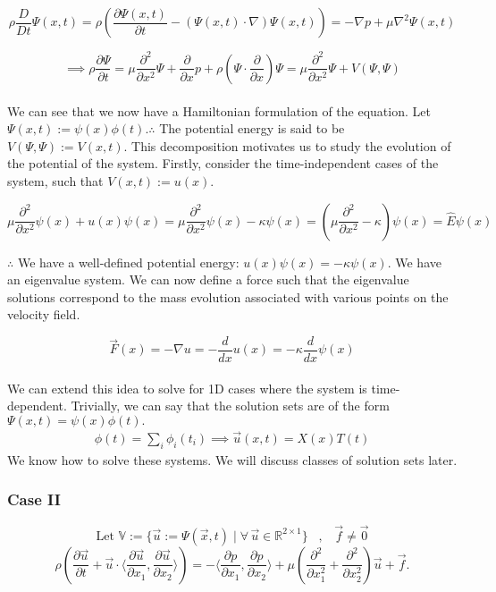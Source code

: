 \documentclass[12pt]{article}
\begin{document}
\[\rho\frac{D}{Dt} \Psi(x,t) = \rho \left( \frac{\partial \Psi(x,t)}{\partial t} - (\Psi(x,t) \cdot \nabla )\Psi(x,t) \right) = -\nabla p + \mu \nabla^{2}\Psi(x,t)\]

 \[\implies \rho \frac{\partial \Psi}{\partial t}  = \mu \frac{\partial^{2}}{\partial x^{2}}\Psi + \frac{\partial}{\partial x} p + \rho \left(\Psi \cdot \frac{\partial}{\partial x} \right)\Psi =  \mu \frac{\partial^{2}}{\partial x^{2}}\Psi + V(\Psi, \Psi)\] \\ 
 We can see that we now have a Hamiltonian formulation of the equation. Let $\Psi (x, t) := \psi(x)\phi(t). \therefore $ The potential energy is said to be $V(\Psi, \Psi) := V(x,t)$. This decomposition motivates us to study the evolution of the potential of the system. Firstly, consider the time-independent cases of the system, such that $V(x,t):= u(x)$. 

 \[\mu \frac{\partial^{2}}{\partial x^{2}}\psi(x) + u(x)\psi(x) = \mu \frac{\partial^{2}}{\partial x^{2}}\psi(x) - \kappa \psi(x) = \left( \mu \frac{\partial^{2}}{\partial x^{2}} - \kappa \right)\psi(x) = \hat E \psi(x)\]

$\therefore $ We have a well-defined potential energy: $u(x)\psi(x) = -\kappa \psi(x)$. We have an eigenvalue system. We can now define a force such that the eigenvalue solutions correspond to the mass evolution associated with various points on the velocity field. 

\[\vec F(x) = -\nabla u = - \frac{d}{dx} u (x) = - \kappa \frac{d}{dx}\psi(x)\] \\ 
We can extend this idea to solve for 1D cases where the system is time-dependent. Trivially, we can say that the solution sets are of the form $\Psi(x,t) = \psi(x)\phi(t).$ 
\begin{align}
\phi(t) = \sum_{i} \phi_{i}(t_{i}) \implies \vec u (x,t) = X(x)T(t)\end{align}
We know how to solve these systems. We will discuss classes of solution sets later. 

\subsubsection {Case II}
\textbf{\[\text{Let } \mathbb{V} := \{\vec u := \Psi (\vec x,t)\;|\;\forall \,\vec u \in \mathbb{R}^{2 \times 1} \}\;\;\;,\;\;\; \vec f \ne \vec 0 \]}
\[
\rho \left( \frac{\partial \vec{u}}{\partial t} + \vec{u} \cdot \langle \frac{\partial \vec u}{\partial x_1}, \frac{\partial \vec u}{\partial x_2} \rangle \right) = 
-\langle \frac{\partial p}{\partial x_1}, \frac{\partial p}{\partial x_2} \rangle 
+ \mu \left( \frac{\partial^2}{\partial x_1^2} + \frac{\partial^2}{\partial x_2^2} \right) \vec{u} + \vec{f}.
\]
\end{document}
